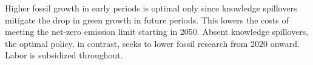  Higher fossil growth in early periods is optimal only since knowledge spillovers mitigate the drop in green growth in future periods. This lowers the costs of meeting the net-zero emission limit starting in 2050. Absent knowledge spillovers, the optimal policy, in contrast, seeks to lower fossil research from 2020 onward. Labor is subsidized throughout. 


